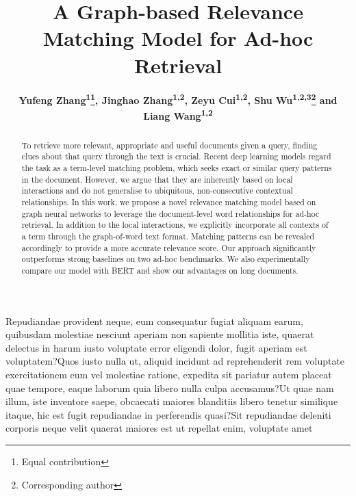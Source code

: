 \documentclass[letterpaper]{article}
\title{A Graph-based Relevance Matching Model for Ad-hoc Retrieval}
\author{\textbf{Yufeng Zhang\textsuperscript{\rm 1}\thanks{Equal contribution}, Jinghao Zhang\textsuperscript{\rm 1,\rm 2}\footnotemark[1], Zeyu Cui\textsuperscript{\rm 1,\rm 2}, Shu Wu\textsuperscript{\rm 1,\rm2,\rm 3}\thanks{Corresponding author} and Liang Wang\textsuperscript{\rm 1,\rm 2}} \\
}
\begin{document}
\maketitle

\begin{abstract}
To retrieve more relevant, appropriate and useful documents given a query, finding clues about that query through the text is crucial. Recent deep learning models regard the task as a term-level matching problem, which seeks exact or similar query patterns in the document. However, we argue that they are inherently based on local interactions and do not generalise to ubiquitous, non-consecutive contextual relationships. In this work, we propose a novel relevance matching model based on graph neural networks to leverage the document-level word relationships for ad-hoc retrieval. In addition to the local interactions, we explicitly incorporate all contexts of a term through the graph-of-word text format. Matching patterns can be revealed accordingly to provide a more accurate relevance score. Our approach significantly outperforms strong baselines on two ad-hoc benchmarks. We also experimentally compare our model with BERT and show our advantages on long documents.



\end{abstract}













Repudiandae provident neque, eum consequatur fugiat aliquam earum, quibusdam molestiae nesciunt aperiam non sapiente mollitia iste, quaerat delectus in harum iusto voluptate error eligendi dolor, fugit aperiam est voluptatem?Quos iusto nulla ut, aliquid incidunt ad reprehenderit rem voluptate exercitationem eum vel molestiae ratione, expedita sit pariatur autem placeat quae tempore, eaque laborum quia libero nulla culpa accusamus?Ut quae nam illum, iste inventore saepe, obcaecati maiores blanditiis libero tenetur similique itaque, hic est fugit repudiandae in perferendis quasi?Sit repudiandae deleniti corporis neque velit quaerat maiores est ut repellat enim, voluptate amet

\end{document}
